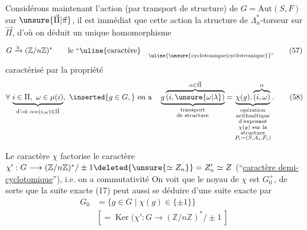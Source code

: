 Considérons maintenant l'action (par transport de structure) de $G=\mathrm{Aut}(S,F)$ sur $\unsure{\vec\Pi|\vec\pi}$, il est immédiat que cette action  la  structure de $\Lambda_n^*$-torseur sur $\vec\Pi$, d'où on déduit un unique homomorphisme
\[
G\xrightarrow{\chi}(\mathbb Z/n\mathbb Z)^*\qquad
\text{le ``\uline{caractère}}\quad\substack{\strut\\\text{\uline{\unsure{cyclotomique|cyclotromique}}''}}
\tag*{(57)}
\]
caractérisé par la propriété
\[
\forall\,\underbrace{i\in\Pi,\ \omega\in\mu(i)}_{\text{d'où }\alpha=(i,\omega)\in\vec\Pi},
\ \inserted{g\in G,}\ \text{on a}\quad
\underbrace{g\overbrace{(i,\unsure{\omega|\lambda})}^{\alpha\in\vec\Pi}}_{\substack{\text{transport}\\\text{de structure}}}
=\underbrace{\chi(g).\overbrace{(i,\omega)}^\alpha}_{\substack{\text{opération}\\\text{arithmétique}\\\text{d'exposant}\\
\chi(g)\text{ sur la}\\\text{structure}\\P_i=(S,A_i,F_i)}}.
\tag*{(58)}
\]

Le caractère $\chi$ factorise le caractère $\chi':G\longrightarrow(\mathbb Z/n\mathbb Z)^*/\pm1\deleted{\unsure{\simeq Z_n}}=Z'_n\simeq Z$ (``\uline{caractère demi-cyclotomique}''), i.e. on a commutativité 
On voit que le noyau de $\chi$ est $G_0^+$, de sorte que la suite exacte (17) peut aussi se déduire d'une suite exacte
 par
\[
\begin{aligned}
G_0&=\{g\in G\mid\chi(g)\in\{\pm1\}\}\\
&[=\operatorname{Ker}(\chi':G\longrightarrow(\mathbb Z/n\mathbb Z)^*/\pm1\ ]
\end{aligned}\tag*{(61)}
\]

